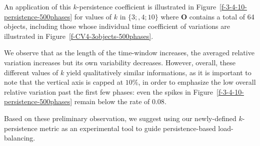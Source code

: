 An application of this $k$-persistence coefficient is illustrated in
Figure~\ref{f-3-4-10-persistence-500phases} for values of
$k$ in $\{3;,4;10\}$ where $\textbf{O}$ contains a total of 64 objects,
including those whose individual time coefficient of variations are
illustrated in Figure~\ref{f-CV4-3objects-500phases}.

We observe that as the length of the time-window increases, the
averaged relative variation increases but its own variability
decreases. However, overall, these different values of $k$ yield
qualitatively similar informations, as it is important to note that
the vertical axis is capped at $10\%$, in order to emphasize the low
overall relative variation past the first few phases: even the spikes
in Figure~\ref{f-3-4-10-persistence-500phases} remain below the rate
of $0.08$.

Based on these preliminary observation, we suggest using our
newly-defined $k$-persistence metric as an experimental tool to guide
persistence-based load-balancing.

